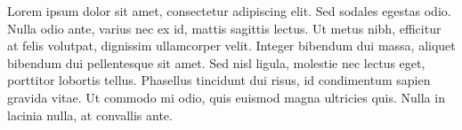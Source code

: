 \documentclass{article}
\begin{document}
\beginnumbering
\pstart
Lorem ipsum dolor sit amet, consectetur adipiscing elit. Sed sodales egestas odio. Nulla odio ante, varius nec ex id, mattis sagittis lectus. Ut metus nibh, efficitur at felis volutpat, dignissim ullamcorper velit. Integer bibendum dui massa, aliquet bibendum dui pellentesque sit amet. Sed nisl ligula, molestie nec lectus eget, porttitor lobortis tellus. Phasellus tincidunt dui risus, id condimentum sapien gravida vitae. Ut commodo mi odio, quis euismod magna ultricies quis. Nulla in lacinia nulla, at convallis ante.
\pend
\endnumbering
\end{document}
